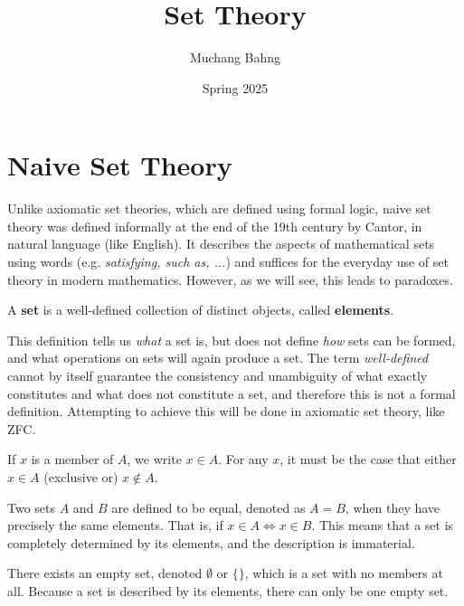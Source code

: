 \documentclass{article}
\begin{document}
\title{Set Theory}
\author{Muchang Bahng}
\date{Spring 2025}

\maketitle
\tableofcontents
\pagebreak

\section{Naive Set Theory}

  Unlike axiomatic set theories, which are defined using formal logic, naive set theory was defined informally at the end of the 19th century by Cantor, in natural language (like English). It describes the aspects of mathematical sets using words (e.g. \textit{satisfying, such as, ...}) and suffices for the everyday use of set theory in modern mathematics. However, as we will see, this leads to paradoxes. 

  \begin{definition}[Set]
    A \textbf{set} is a well-defined collection of distinct objects, called \textbf{elements}. 
  \end{definition}

  This definition tells us \textit{what} a set is, but does not define \textit{how} sets can be formed, and what operations on sets will again produce a set. The term \textit{well-defined} cannot by itself guarantee the consistency and unambiguity of what exactly constitutes and what does not constitute a set, and therefore this is not a formal definition. Attempting to achieve this will be done in axiomatic set theory, like ZFC. 

  \begin{definition}[Membership]
    If $x$ is a member of $A$, we write $x \in A$. For any $x$, it must be the case that either $x \in A$ (exclusive or) $x \not\in A$. 
  \end{definition}
  
  \begin{definition}[Equality]
    Two sets $A$ and $B$ are defined to be equal, denoted as $A = B$, when they have precisely the same elements. That is, if $x \in A \iff x \in B$. This means that a set is completely determined by its elements, and the description is immaterial. 
  \end{definition}

  \begin{definition}
    There exists an empty set, denoted $\emptyset$ or $\{\}$, which is a set with no members at all. Because a set is described by its elements, there can only be one empty set. 
  \end{definition}
\end{document}
